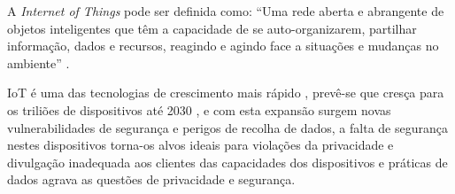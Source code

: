 \documentclass[conference]{IEEEtran}
\begin{document}

A \textit{Internet of Things} pode ser definida como: ``Uma rede aberta e
abrangente de objetos inteligentes que têm a capacidade de se auto-organizarem,
partilhar informação, dados e recursos, reagindo e agindo face a situações
e mudanças no ambiente'' \cite{madakam2015internet}.


IoT é uma das tecnologias de crescimento mais rápido \cite{MohammadState},
prevê-se que cresça para os triliões de dispositivos até 2030 \cite{SarawiInternet},
e com esta expansão surgem novas vulnerabilidades de segurança e perigos
de recolha de dados, a falta de segurança nestes dispositivos torna-os alvos
ideais para violações da privacidade e divulgação inadequada aos clientes
das capacidades dos dispositivos e práticas de dados agrava as questões de
privacidade e segurança.

\end{document}
